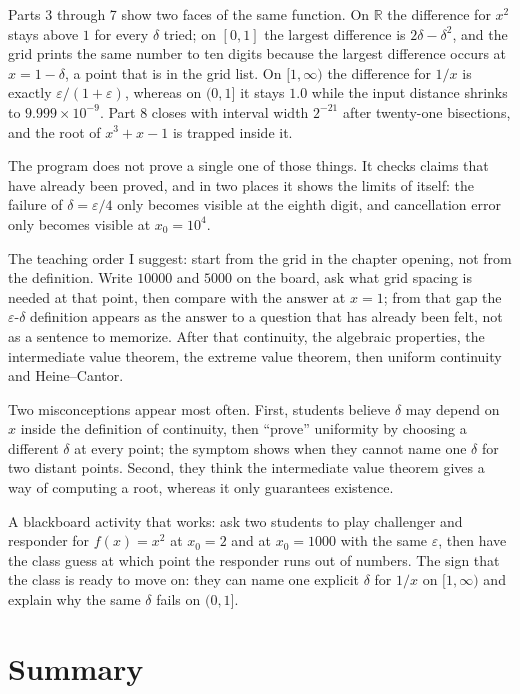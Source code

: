 Parts 3 through 7 show two faces of the same function. On $\mathbb{R}$ the difference
for $x^{2}$ stays above $1$ for every $\delta$ tried; on $[0,1]$ the largest
difference is $2\delta-\delta^{2}$, and the grid prints the same number to ten
digits because the largest difference occurs at $x=1-\delta$, a point that is in the grid
list. On $[1,\infty)$ the difference for $1/x$ is exactly $\varepsilon/(1+\varepsilon)$,
whereas on $(0,1]$ it stays $1.0$ while the input distance shrinks to
$9.999\times10^{-9}$. Part 8 closes with interval width $2^{-21}$ after twenty-one
bisections, and the root of $x^{3}+x-1$ is trapped inside it.

The program does not prove a single one of those things. It checks claims that have already
been proved, and in two places it shows the limits of itself: the failure of
$\delta=\varepsilon/4$ only becomes visible at the eighth digit, and cancellation error
only becomes visible at $x_{0}=10^{4}$.

\begin{untukdosen}
The teaching order I suggest: start from the grid in the chapter opening, not from the
definition. Write $10000$ and $5000$ on the board, ask what grid spacing is needed at
that point, then compare with the answer at $x=1$; from that gap the
$\varepsilon$-$\delta$ definition appears as the answer to a question that has already
been felt, not as a sentence to memorize. After that continuity, the algebraic properties,
the intermediate value theorem, the extreme value theorem, then uniform continuity and
Heine--Cantor.

Two misconceptions appear most often. First, students believe $\delta$ may depend on $x$
inside the definition of continuity, then ``prove'' uniformity by choosing a different
$\delta$ at every point; the symptom shows when they cannot name one $\delta$ for two
distant points. Second, they think the intermediate value theorem gives a way of
computing a root, whereas it only guarantees existence.

A blackboard activity that works: ask two students to play challenger and responder for
$f(x)=x^{2}$ at $x_{0}=2$ and at $x_{0}=1000$ with the same $\varepsilon$,
then have the class guess at which point the responder runs out of numbers. The sign that
the class is ready to move on: they can name one explicit $\delta$ for $1/x$
on $[1,\infty)$ and explain why the same $\delta$ fails on $(0,1]$.
\end{untukdosen}

\section{Summary}

